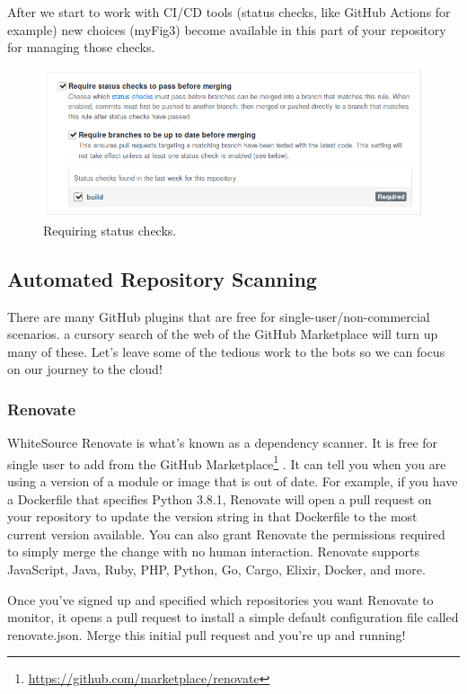 \justify
After we start to work with CI/CD tools (status checks, like GitHub
Actions for example) new choices ({myFig3}) become available in this
part of your repository for managing those checks.

\begin{figure}
      \includegraphics[scale=0.53]{../images/guthub-status-check.png}
      \caption{Requiring status checks.}
\end{figure}

\subsection{Automated Repository Scanning}

\justify
There are many GitHub plugins that are free for
single-user/non-commercial scenarios. a cursory search of the web of the
GitHub Marketplace will turn up many of these. Let's leave some of the
tedious work to the bots so we can focus on our journey to the cloud!


\subsubsection{Renovate}

WhiteSource Renovate is what's known as a dependency scanner. It is free
for single user to add from the GitHub Marketplace\footnote{\url{https://github.com/marketplace/renovate}}
. It can tell you when you are using a version of a module or image that
is out of date. For example, if you have a Dockerfile that specifies
Python 3.8.1, Renovate will open a pull request on your repository to
update the version string in that Dockerfile to the most current version
available. You can also grant Renovate the permissions required to
simply merge the change with no human interaction. Renovate supports
JavaScript, Java, Ruby, PHP, Python, Go, Cargo, Elixir, Docker, and
more.

\justify
Once you've signed up and specified which repositories you want Renovate
to monitor, it opens a pull request to install a simple default
configuration file called renovate.json. Merge this initial pull request
and you're up and running!

